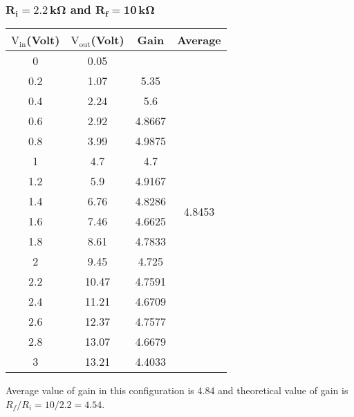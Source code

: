 \documentclass[12pt]{article}
\begin{document}
\subsubsection{$\mathbf{R_i = 2.2\, k \Omega}$ and $\mathbf{R_f = 10\, k \Omega}$}
\begin{table}[H]
	\centering
	\begin{tabular}{|c|c|c|c|}
		\hline
		$\mathrm{V_{in}}$(Volt) & $\mathrm{V_{out}}$(Volt) & Gain             & Average                            \\ \hline \hline
		0            & 0.05          &        & \multirow{16}{*}{4.8453} \\ \cline{1-3}
		0.2          & 1.07          & 5.35   &                          \\ \cline{1-3}
		0.4          & 2.24          & 5.6    &                          \\ \cline{1-3}
		0.6          & 2.92          & 4.8667 &                          \\ \cline{1-3}
		0.8          & 3.99          & 4.9875 &                          \\ \cline{1-3}
		1            & 4.7           & 4.7    &                          \\ \cline{1-3}
		1.2          & 5.9           & 4.9167 &                          \\ \cline{1-3}
		1.4          & 6.76          & 4.8286 &                          \\ \cline{1-3}
		1.6          & 7.46          & 4.6625 &                          \\ \cline{1-3}
		1.8          & 8.61          & 4.7833 &                          \\ \cline{1-3}
		2            & 9.45          & 4.725  &                          \\ \cline{1-3}
		2.2          & 10.47         & 4.7591 &                          \\ \cline{1-3}
		2.4          & 11.21         & 4.6709 &                          \\ \cline{1-3}
		2.6          & 12.37         & 4.7577 &                          \\ \cline{1-3}
		2.8          & 13.07         & 4.6679 &                          \\ \cline{1-3}
		3            & 13.21         & 4.4033 &                          \\ \hline
	\end{tabular}
\end{table}
Average value of gain in this configuration is 4.84 and theoretical value of gain is $ R_f/R_i = 10/2.2 = 4.54 $. 
\end{document}

